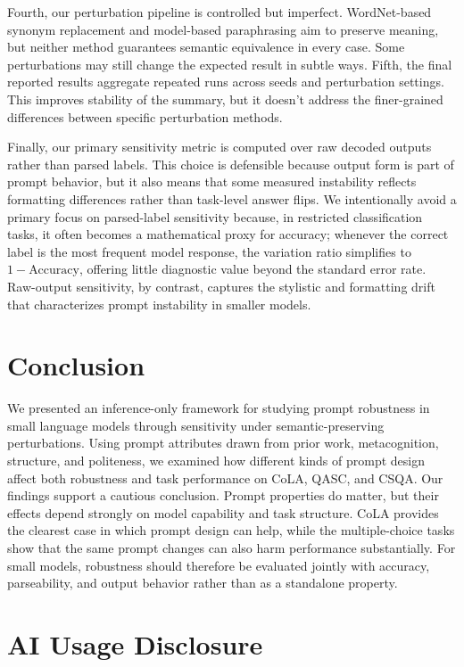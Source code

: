 \documentclass[11pt]{article}
\begin{document}
Fourth, our perturbation pipeline is controlled but imperfect. WordNet-based synonym replacement and model-based paraphrasing aim to preserve meaning, but neither method guarantees semantic equivalence in every case. Some perturbations may still change the expected result in subtle ways. Fifth, the final reported results aggregate repeated runs across seeds and perturbation settings. This improves stability of the summary, but it doesn't address the finer-grained differences between specific perturbation methods.

Finally, our primary sensitivity metric is computed over raw decoded outputs rather than parsed labels. This choice is defensible because output form is part of prompt behavior, but it also means that some measured instability reflects formatting differences rather than task-level answer flips. We intentionally avoid a primary focus on parsed-label sensitivity because, in restricted classification tasks, it often becomes a mathematical proxy for accuracy; whenever the correct label is the most frequent model response, the variation ratio simplifies to $1 - \text{Accuracy}$, offering little diagnostic value beyond the standard error rate. Raw-output sensitivity, by contrast, captures the stylistic and formatting drift that characterizes prompt instability in smaller models.

\section{Conclusion}

We presented an inference-only framework for studying prompt robustness in small language models through sensitivity under semantic-preserving perturbations. Using prompt attributes drawn from prior work, metacognition, structure, and politeness, we examined how different kinds of prompt design affect both robustness and task performance on CoLA, QASC, and CSQA. Our findings support a cautious conclusion. Prompt properties do matter, but their effects depend strongly on model capability and task structure. CoLA provides the clearest case in which prompt design can help, while the multiple-choice tasks show that the same prompt changes can also harm performance substantially. For small models, robustness should therefore be evaluated jointly with accuracy, parseability, and output behavior rather than as a standalone property.

\section*{AI Usage Disclosure}
\end{document}
